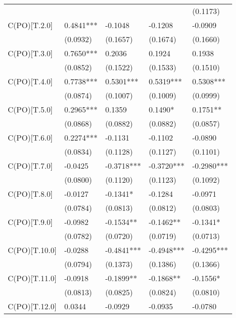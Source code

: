 \begin{table}
\begin{center}
\begin{tabular}{lllll}
                         &            &            &            & (0.1173)    \\
C(PO)[T.2.0]             & 0.4841***  & -0.1048    & -0.1208    & -0.0909     \\
                         & (0.0932)   & (0.1657)   & (0.1674)   & (0.1660)    \\
C(PO)[T.3.0]             & 0.7650***  & 0.2036     & 0.1924     & 0.1938      \\
                         & (0.0852)   & (0.1522)   & (0.1533)   & (0.1510)    \\
C(PO)[T.4.0]             & 0.7738***  & 0.5301***  & 0.5319***  & 0.5308***   \\
                         & (0.0874)   & (0.1007)   & (0.1009)   & (0.0999)    \\
C(PO)[T.5.0]             & 0.2965***  & 0.1359     & 0.1490*    & 0.1751**    \\
                         & (0.0868)   & (0.0882)   & (0.0882)   & (0.0857)    \\
C(PO)[T.6.0]             & 0.2274***  & -0.1131    & -0.1102    & -0.0890     \\
                         & (0.0834)   & (0.1128)   & (0.1127)   & (0.1101)    \\
C(PO)[T.7.0]             & -0.0425    & -0.3718*** & -0.3720*** & -0.2980***  \\
                         & (0.0800)   & (0.1120)   & (0.1123)   & (0.1092)    \\
C(PO)[T.8.0]             & -0.0127    & -0.1341*   & -0.1284    & -0.0971     \\
                         & (0.0784)   & (0.0813)   & (0.0812)   & (0.0803)    \\
C(PO)[T.9.0]             & -0.0982    & -0.1534**  & -0.1462**  & -0.1341*    \\
                         & (0.0782)   & (0.0720)   & (0.0719)   & (0.0713)    \\
C(PO)[T.10.0]            & -0.0288    & -0.4841*** & -0.4948*** & -0.4295***  \\
                         & (0.0794)   & (0.1373)   & (0.1386)   & (0.1366)    \\
C(PO)[T.11.0]            & -0.0918    & -0.1899**  & -0.1868**  & -0.1556*    \\
                         & (0.0813)   & (0.0825)   & (0.0824)   & (0.0810)    \\
C(PO)[T.12.0]            & 0.0344     & -0.0929    & -0.0935    & -0.0780     \\

\end{tabular}
\end{center}
\end{table}
